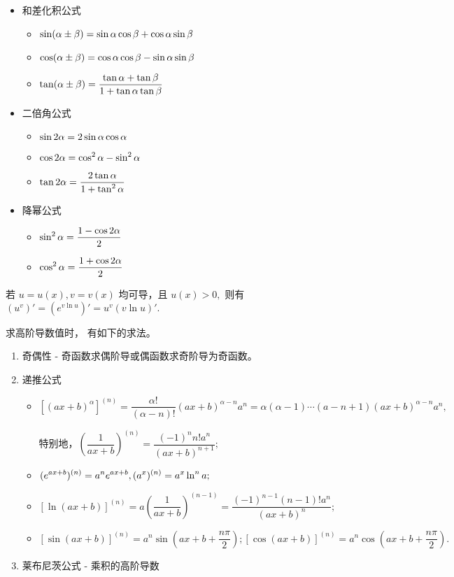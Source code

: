 \begin{Appendices}
\begin{itemize}
    \item 和差化积公式
    \begin{itemize}
        \item $\displaystyle \sin(\alpha\pm\beta) = \sin\alpha\cos\beta+\cos\alpha\sin\beta $
        \item $\displaystyle \cos(\alpha\pm\beta) = \cos\alpha\cos\beta-\sin\alpha\sin\beta $
        \item $\displaystyle \tan(\alpha\pm\beta) = \dfrac{\tan\alpha+\tan\beta}{1+\tan\alpha\tan\beta}$
    \end{itemize}
    \item 二倍角公式
    \begin{itemize}
        \item $\displaystyle \sin 2\alpha = 2\sin\alpha\cos\alpha $
        \item $\displaystyle \cos 2\alpha = \cos^2\alpha - \sin^2\alpha $
        \item $\displaystyle \tan 2\alpha = \dfrac{2\tan\alpha}{1+\tan^2\alpha}$
    \end{itemize}
    \item 降幂公式
    \begin{itemize}
        \item $\displaystyle \sin^2 \alpha = \dfrac{1-\cos 2\alpha}{2} $ 
        \item $\displaystyle \cos^2 \alpha = \dfrac{1+\cos 2\alpha}{2} $
    \end{itemize}
\end{itemize}


若 $ u = u(x),v = v(x) $ 均可导，且 $ u(x)>0, $ 
则有 $ (u^v)' = (e^{v\ln u})' = u^v(v\ln u)'. $ 


求高阶导数值时， 有如下的求法。
\begin{enumerate}
    \item 奇偶性 - 奇函数求偶阶导或偶函数求奇阶导为奇函数。
    \item 递推公式
    \begin{itemize}[parsep = 6pt]
        \item $ [(ax+b)^\alpha]^{(n)} = \dfrac{\alpha !}{(\alpha - n)!}(ax+b)^{\alpha-n}a^n = 
        \alpha(\alpha - 1)\cdots(a-n+1)(ax+b)^{\alpha-n}a^n, $ 
        
        特别地，$ \left(\dfrac{1}{ax+b}\right)^{(n)} = \dfrac{(-1)^nn!a^n}{(ax+b)^{n+1}}; $ 
        \item $ \displaystyle (e^{ax+b})^{(n)} = a^ne^{ax+b},(a^x)^{(n)} = a^x\ln^n a;$ 
        \item $ [\ln(ax+b)]^{(n)} = a\left(\dfrac{1}{ax+b}\right)^{(n-1)} = \dfrac{(-1)^{n-1}(n-1)!a^n}{(ax+b)^n}; $ 
        \item $ [\sin(ax+b)]^{(n)} = a^n\sin(ax+b+\dfrac{n\pi}{2});
        [\cos(ax+b)]^{(n)} = a^n\cos(ax+b+\dfrac{n\pi}{2}). $ 
    \end{itemize}
    \item 莱布尼茨公式 - 乘积的高阶导数
    

\end{enumerate}
\end{Appendices}
